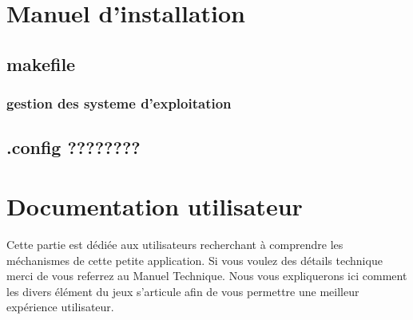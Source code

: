 \documentclass[a4paper 12pts]{article}
\begin{document}
\newpage

\section{Manuel d'installation}

\vspace{1.5cm}


\subsection{makefile}



\subsubsection{gestion des systeme d'exploitation}

\subsection{.config ????????}


\newpage

\section{Documentation utilisateur}


\vspace{2cm}

Cette partie est dédiée aux utilisateurs recherchant à comprendre les méchanismes de cette petite application.
Si vous voulez des détails technique merci de vous referrez au Manuel Technique.
Nous vous expliquerons ici comment les divers élément du jeux s'articule afin de vous permettre une meilleur expérience utilisateur.

\vspace{0.5cm}	
\end{document}
